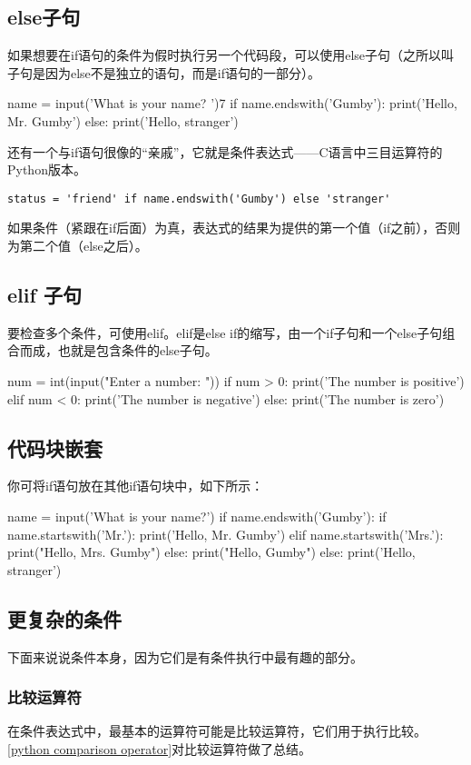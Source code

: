 \subsection{else子句}
如果想要在if语句的条件为假时执行另一个代码段，可以使用else子句（之所以叫子句是因为else不是独立的语句，而是if语句的一部分）。
\begin{pyc}
name = input('What is your name? ')7
if name.endswith('Gumby'):
    print('Hello, Mr. Gumby')
else:
    print('Hello, stranger')
\end{pyc}

还有一个与if语句很像的“亲戚”，它就是条件表达式——C语言中三目运算符的Python版本。

\verb|status = 'friend' if name.endswith('Gumby') else 'stranger'|

如果条件（紧跟在if后面）为真，表达式的结果为提供的第一个值（if之前），否则为第二个值（else之后）。
\subsection{elif 子句}
要检查多个条件，可使用elif。elif是else if的缩写，由一个if子句和一个else子句组合而成，也就是包含条件的else子句。
\begin{pyc}
num = int(input("Enter a number: "))
if num > 0:
    print('The number is positive')
elif num < 0:
    print('The number is negative')
else:
    print('The number is zero')
\end{pyc}

\subsection{代码块嵌套}
你可将if语句放在其他if语句块中，如下所示：
\begin{pyc}
name = input('What is your name?')
if name.endswith('Gumby'):
    if name.startswith('Mr.'):
        print('Hello, Mr. Gumby')
    elif name.startswith('Mrs.'):
        print("Hello, Mrs. Gumby")
    else:
        print("Hello, Gumby")
else:
    print('Hello, stranger')
\end{pyc}
\subsection{更复杂的条件}
下面来说说条件本身，因为它们是有条件执行中最有趣的部分。
\subsubsection{比较运算符}
在条件表达式中，最基本的运算符可能是比较运算符，它们用于执行比较。\autoref{python comparison operator}对比较运算符做了总结。

